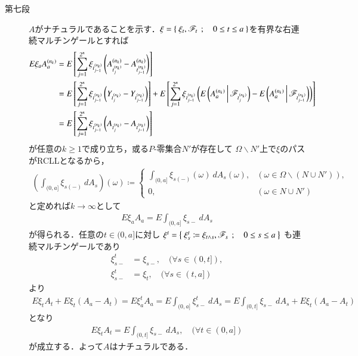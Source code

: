 \begin{prf}[未修正]
\begin{description}
			\item[第七段]
				$A$がナチュラルであることを示す．$\xi = \left\{\ \xi_t,\mathscr{F}_t\ \, ; \quad 0 \leq t \leq a\ \right\}$を有界な右連続マルチンゲールとすれば
				\begin{align}
					E \xi_a A^{(n_k)}_a 
					&= E\left[ \sum_{j=1}^{2^n}\xi_{t^{(n_k)}_{j-1}} \left( A^{(n_k)}_{t^{(n_k)}_j} - A^{(n_k)}_{t^{(n_k)}_{j-1}} \right) \right]\\
					&= E\left[ \sum_{j=1}^{2^n}\xi_{t^{(n_k)}_{j-1}} \left( Y_{t^{(n_k)}_j} - Y_{t^{(n_k)}_{j-1}} \right) \right]
						+ E\left[ \sum_{j=1}^{2^n}\xi_{t^{(n_k)}_{j-1}} \left( E\left( A^{(n_k)}_a \, \middle|\, \mathscr{F}_{t^{(n_k)}_j} \right) - E\left( A^{(n_k)}_a \, \middle|\, \mathscr{F}_{t^{(n_k)}_{j-1}} \right) \right) \right] \\
					&= E\left[ \sum_{j=1}^{2^n}\xi_{t^{(n_k)}_{j-1}} \left( A_{t^{(n_k)}_j} - A_{t^{(n_k)}_{j-1}} \right) \right]
				\end{align}
				が任意の$k \geq 1$で成り立ち，或る$P$-零集合$N'$が存在して
				$\Omega \backslash N'$上で$\xi$のパスがRCLLとなるから，
				\begin{align}
					\left(\int_{(0,a]} \xi_{s(-)}\ dA_s\right)(\omega)
					\coloneqq 
					\begin{cases}
						\displaystyle\int_{(0,a]} \xi_{s(-)}(\omega)\ dA_s(\omega), & (\omega \in \Omega \backslash (N \cup N')), \\
						0, & (\omega \in N \cup N')
					\end{cases}
				\end{align}
				と定めれば$k \longrightarrow \infty$として
				\begin{align}
					E \xi_a A_a = E \int_{(0,a]} \xi_{s-}\ dA_s
				\end{align}
				が得られる．任意の$t \in (0,a]$に対し
				$\xi^t = \left\{\ \xi^t_s \coloneqq \xi_{t \wedge s},\mathscr{F}_s\ \, ; \quad 0 \leq s \leq a\ \right\}$
				も連続マルチンゲールであり
				\begin{align}
					\xi^t_{s-} &= \xi_{s-},\quad (\forall s \in (0,t]), \\
					\xi^t_{s-} &= \xi_t, \quad (\forall s \in (t,a])
				\end{align}
				より
				\begin{align}
					E \xi_t A_t + E \xi_t(A_a - A_t) = E \xi^t_a A_a 
					= E \int_{(0,a]} \xi^t_{s-}\ dA_s
					= E \int_{(0,t]} \xi_{s-}\ dA_s + E \xi_t (A_a - A_t)
				\end{align}
				となり
				\begin{align}
					E \xi_t A_t = E \int_{(0,t]} \xi_{s-}\ dA_s,
					\quad (\forall t \in (0,a])
				\end{align}
				が成立する．よって$A$はナチュラルである．
		\end{description}
	\end{prf}
	

